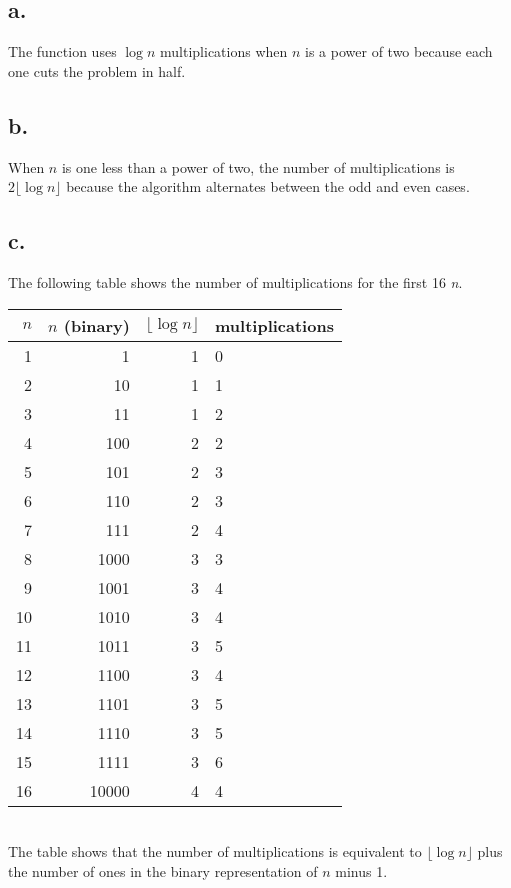 \documentclass[12pt]{article}
\begin{document}
\subsection*{a.}
The function uses $\log{n}$ multiplications when $n$ is a power of
two because each one cuts the problem in half.
\subsection*{b.}
When $n$ is one less than a power of two, the number of
multiplications is $2\lfloor\log{n}\rfloor$ because the algorithm
alternates between the odd and even cases.

\subsection*{c.}
The following table shows the number of multiplications for the first 16 \emph{n}.\\
\newline
\begin{tabular}{r|r|r||l}
$n$ & $n$ (binary) & $\lfloor\log n \rfloor$  &multiplications\\
\hline
1 & 1 &     1&  0\\
2 & 10&     1&  1\\
3 & 11&     1&  2\\
4 & 100&    2&  2\\
5 & 101&    2&  3\\
6 & 110&    2&  3\\
7 & 111&    2&  4\\
8 & 1000&   3&  3\\
9 & 1001&   3&  4\\
10 & 1010&  3&  4\\
11 & 1011&  3&  5\\
12 & 1100&  3&  4\\
13 & 1101&  3&  5\\
14 & 1110&  3&  5\\
15 & 1111&  3&  6\\
16 & 10000& 4&  4\\
\end{tabular}\\
\newline
The table shows that the number of multiplications is equivalent
to $\lfloor\log n\rfloor$ plus
 the number of ones in the binary representation of $n$ minus 1.
\end{document}
